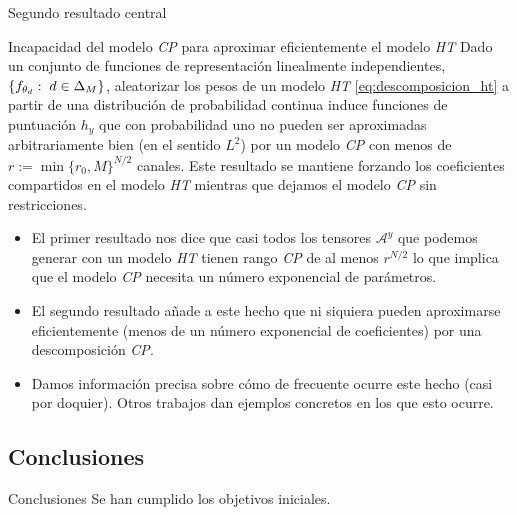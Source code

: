 \begin{frame}{Segundo resultado central}

	\begin{block}{Incapacidad del modelo \textit{CP} para aproximar eficientemente el modelo \textit{HT}}
		Dado un conjunto de funciones de representación linealmente independientes, $\{ f_{\theta_d}: \; d \in \Delta_{M} \}$, aleatorizar los pesos de un modelo \textit{HT} \eqref{eq:descomposicion_ht} a partir de una distribución de probabilidad continua induce funciones de puntuación $h_y$ que con probabilidad uno no pueden ser aproximadas arbitrariamente bien (en el sentido $L^2$) por un modelo \textit{CP} con menos de $r := \min \{r_0, M \}^{N/2}$ canales. Este resultado se mantiene forzando los coeficientes compartidos en el modelo \textit{HT} mientras que dejamos el modelo \textit{CP} sin restricciones.
	\end{block}

\end{frame}

\begin{frame}
	\begin{itemize}
		\item El primer resultado nos dice que casi todos los tensores $\mathcal{A}^y$ que podemos generar con un modelo \textit{HT} tienen rango \textit{CP} de al menos $r^{N/2}$ lo que implica que el modelo \textit{CP} necesita un número exponencial de parámetros.
		\item El segundo resultado añade a este hecho que ni siquiera pueden aproximarse eficientemente (menos de un número exponencial de coeficientes) por una descomposición \textit{CP}.
		\item Damos información precisa sobre cómo de frecuente ocurre este hecho (casi por doquier). Otros trabajos \cite{matematicas:descomposicion_ht} dan ejemplos concretos en los que esto ocurre.
	\end{itemize}
\end{frame}

\subsection{Conclusiones}
\begin{frame}{Conclusiones}
	Se han cumplido los objetivos iniciales.
\end{frame}
